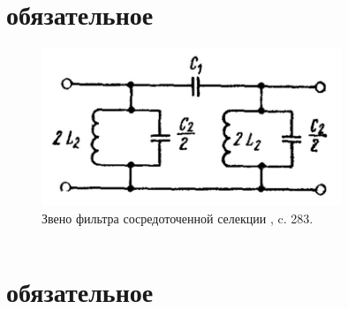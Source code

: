 
\section[Листинг программы расчёта ФСС]{обязательное}\label{app:matlab_fss}

%




\begin{figure}[H] \centering
  \includegraphics[width=0.8\textwidth]{./content/Sivers_filter.jpg}
  \caption{Звено фильтра сосредоточенной селекции \cite{Sivers}, c. 283. } \label{p:Sivers_filter}
\end{figure}





\inputminted[fontsize=\small, linenos, breaklines, numbersep=2mm, xleftmargin=5mm]{matlab}{./content/FiltrPH.m}



\section[Листинг программы расчёта входной цепи с индукнтивно-емкостной связью]{обязательное}\label{app:matlab_vplc}


